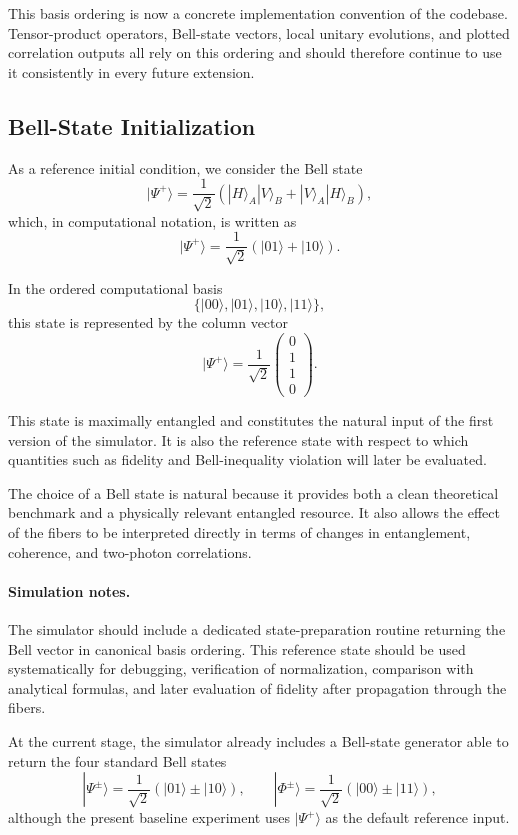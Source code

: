 \documentclass[a4paper]{article}
\begin{document}
This basis ordering is now a concrete implementation convention of the codebase. Tensor-product operators, Bell-state vectors, local unitary evolutions, and plotted correlation outputs all rely on this ordering and should therefore continue to use it consistently in every future extension.

\subsection{Bell-State Initialization}

As a reference initial condition, we consider the Bell state
\[
|\Psi^{+}\rangle
=
\frac{1}{\sqrt{2}}
\left(
|H\rangle_A |V\rangle_B
+
|V\rangle_A |H\rangle_B
\right),
\]
which, in computational notation, is written as
\[
|\Psi^{+}\rangle
=
\frac{1}{\sqrt{2}}
\left(
|01\rangle + |10\rangle
\right).
\]

In the ordered computational basis
\[
\{|00\rangle, |01\rangle, |10\rangle, |11\rangle\},
\]
this state is represented by the column vector
\[
|\Psi^{+}\rangle
=
\frac{1}{\sqrt{2}}
\begin{pmatrix}
0\\
1\\
1\\
0
\end{pmatrix}.
\]

This state is maximally entangled and constitutes the natural input of the first version of the simulator. It is also the reference state with respect to which quantities such as fidelity and Bell-inequality violation will later be evaluated.

The choice of a Bell state is natural because it provides both a clean theoretical benchmark and a physically relevant entangled resource. It also allows the effect of the fibers to be interpreted directly in terms of changes in entanglement, coherence, and two-photon correlations.

\paragraph{Simulation notes.}
The simulator should include a dedicated state-preparation routine returning the Bell vector in canonical basis ordering. This reference state should be used systematically for debugging, verification of normalization, comparison with analytical formulas, and later evaluation of fidelity after propagation through the fibers.

At the current stage, the simulator already includes a Bell-state generator able to return the four standard Bell states
\[
|\Psi^{\pm}\rangle
=
\frac{1}{\sqrt{2}}\left(|01\rangle \pm |10\rangle\right),
\qquad
|\Phi^{\pm}\rangle
=
\frac{1}{\sqrt{2}}\left(|00\rangle \pm |11\rangle\right),
\]
although the present baseline experiment uses \( |\Psi^+\rangle \) as the default reference input.
\end{document}
